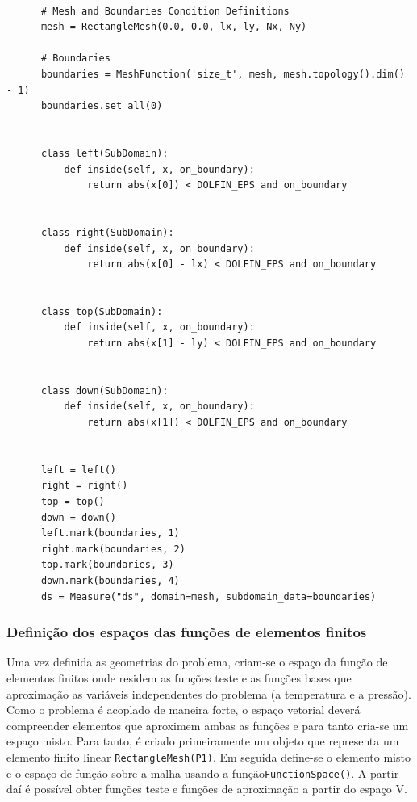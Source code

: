     \begin{verbatim}

      # Mesh and Boundaries Condition Definitions
      mesh = RectangleMesh(0.0, 0.0, lx, ly, Nx, Ny)

      # Boundaries
      boundaries = MeshFunction('size_t', mesh, mesh.topology().dim() - 1)
      boundaries.set_all(0)


      class left(SubDomain):
          def inside(self, x, on_boundary):
              return abs(x[0]) < DOLFIN_EPS and on_boundary
      

      class right(SubDomain):
          def inside(self, x, on_boundary):
              return abs(x[0] - lx) < DOLFIN_EPS and on_boundary


      class top(SubDomain):
          def inside(self, x, on_boundary):
              return abs(x[1] - ly) < DOLFIN_EPS and on_boundary


      class down(SubDomain):
          def inside(self, x, on_boundary):
              return abs(x[1]) < DOLFIN_EPS and on_boundary


      left = left()
      right = right()
      top = top()
      down = down()
      left.mark(boundaries, 1)
      right.mark(boundaries, 2)
      top.mark(boundaries, 3)
      down.mark(boundaries, 4)
      ds = Measure("ds", domain=mesh, subdomain_data=boundaries)
    \end{verbatim} 

    \subsubsection{Definição dos espaços das funções de elementos finitos}
    Uma vez definida as geometrias do problema, criam-se o espaço da função de
    elementos finitos onde residem as funções teste e as funções bases que
    aproximação as variáveis independentes do problema (a temperatura e a
    pressão). Como o problema é acoplado de maneira forte, o espaço vetorial
    deverá compreender elementos que aproximem ambas as funções e para tanto
    cria-se um espaço misto. Para tanto, é criado primeiramente um objeto que
    representa um elemento finito linear
    \texttt{RectangleMesh(P1)}. Em seguida define-se o
    elemento misto e o espaço de função sobre a malha usando a
    função\texttt{FunctionSpace()}. A partir daí é
    possível obter funções teste e funções de aproximação a partir do espaço V.  
    

